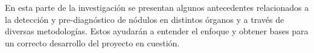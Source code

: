 En esta parte de la investigación se presentan algunos antecedentes relacionados a la detección y pre-diagnóstico de nódulos en distintos órganos y a través de diversas metodologías. Estos ayudarán a entender el enfoque y obtener bases para un correcto desarrollo del proyecto en cuestión.

